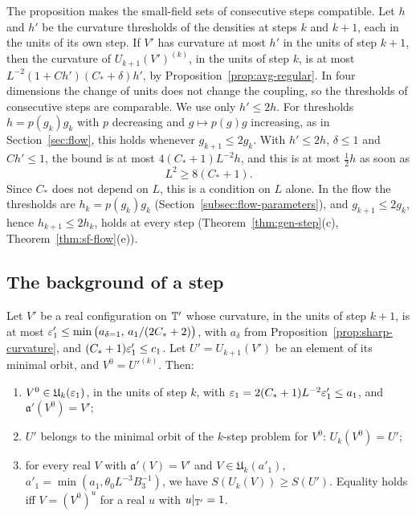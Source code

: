 The proposition makes the small-field sets of consecutive steps compatible. Let $h$ and $h'$ be the curvature thresholds of the densities at steps $k$ and $k+1$, each in the units of its own step. If $V'$ has curvature at most $h'$ in the units of step $k+1$, then the curvature of $U_{k+1}(V')^{(k)}$, in the units of step $k$, is at most $L^{-2}(1+Ch')(C_*+\delta)h'$, by Proposition~\ref{prop:avg-regular}. In four dimensions the change of units does not change the coupling, so the thresholds of consecutive steps are comparable. We use only $h'\le2h$. For thresholds $h=p(g_k)g_k$ with $p$ decreasing and $g\mapsto p(g)g$ increasing, as in Section~\ref{sec:flow}, this holds whenever $g_{k+1}\le2g_k$. With $h'\le2h$, $\delta\le1$ and $Ch'\le1$, the bound is at most $4(C_*+1)L^{-2}h$, and this is at most $\frac12h$ as soon as
\[
L^2\ge8(C_*+1).
\]
Since $C_*$ does not depend on $L$, this is a condition on $L$ alone. In the flow the thresholds are $h_k=p(g_k)g_k$ (Section~\ref{subsec:flow-parameters}), and $g_{k+1}\le2g_k$, hence $h_{k+1}\le2h_k$, holds at every step (Theorem~\ref{thm:gen-step}(c), Theorem~\ref{thm:sf-flow}(e)).

\subsection{The background of a step}\label{ss:31.3}

\begin{lemma}\label{lem:composition}
Let $V'$ be a real configuration on $\mathbb T'$ whose curvature, in the units of step $k+1$, is at most $\varepsilon'_1\le\min\big(a_{\delta=1},\,a_1/(2C_*+2)\big)$, with $a_\delta$ from Proposition~\ref{prop:sharp-curvature}, and $(C_*+1)\varepsilon'_1\le c_1$. Let $U'=U_{k+1}(V')$ be an element of its minimal orbit, and $V^0=U'^{(k)}$. Then:
\begin{enumerate}[label=(\alph*)]
\item $V^0\in\mathfrak U_k(\varepsilon_1)$, in the units of step $k$, with $\varepsilon_1=2(C_*+1)L^{-2}\varepsilon'_1\le a_1$, and $\mathfrak a'(V^0)=V'$;
\item $U'$ belongs to the minimal orbit of the $k$-step problem for $V^0$: $U_k(V^0)=U'$;
\item for every real $V$ with $\mathfrak a'(V)=V'$ and $V\in\mathfrak U_k(a'_1)$, $a'_1=\min(a_1,\theta_0L^{-3}B_3^{-1})$, we have $S(U_k(V))\ge S(U')$. Equality holds iff $V=(V^0)^u$ for a real $u$ with $u|_{\mathbb T'}=1$.
\end{enumerate}
\end{lemma}


